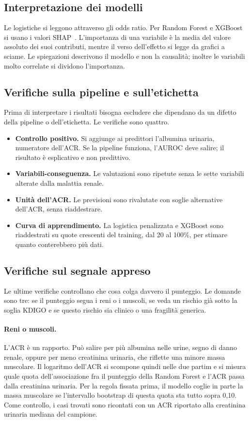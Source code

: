 \documentclass[a4paper, 12pt, oneside]{book}
\begin{document}
\subsection{Interpretazione dei modelli}

Le logistiche si leggono attraverso gli odds ratio. Per Random Forest e XGBoost si usano i valori SHAP~\cite{lundberg_unified_2017}. L'importanza di una variabile è la media del valore assoluto dei suoi contributi, mentre il verso dell'effetto si legge da grafici a sciame. Le spiegazioni descrivono il modello e non la causalità; inoltre le variabili molto correlate si dividono l'importanza.

\subsection{Verifiche sulla pipeline e sull'etichetta}

Prima di interpretare i risultati bisogna escludere che dipendano da un difetto della pipeline o dell'etichetta. Le verifiche sono quattro.
\begin{itemize}
	\item \textbf{Controllo positivo.} Si aggiunge ai predittori l'albumina urinaria, numeratore dell'ACR. Se la pipeline funziona, l'AUROC deve salire; il risultato è esplicativo e non predittivo.
	\item \textbf{Variabili-conseguenza.} Le valutazioni sono ripetute senza le sette variabili alterate dalla malattia renale.
	\item \textbf{Unità dell'ACR.} Le previsioni sono rivalutate con soglie alternative dell'ACR, senza riaddestrare.
	\item \textbf{Curva di apprendimento.} La logistica penalizzata e XGBoost sono riaddestrati su quote crescenti del training, dal 20 al 100\%, per stimare quanto conterebbero più dati.
\end{itemize}

\subsection{Verifiche sul segnale appreso}

Le ultime verifiche controllano che cosa colga davvero il punteggio. Le domande sono tre: se il punteggio segua i reni o i muscoli, se veda un rischio già sotto la soglia KDIGO e se questo rischio sia clinico o una fragilità generica.

\paragraph{Reni o muscoli.} L'ACR è un rapporto. Può salire per più albumina nelle urine, segno di danno renale, oppure per meno creatinina urinaria, che riflette una minore massa muscolare. Il logaritmo dell'ACR si scompone quindi nelle due partim e si misura quale quota dell'associazione fra il punteggio della Random Forest e l'ACR passa dalla creatinina urinaria. Per la regola fissata prima, il modello coglie in parte la massa muscolare se l'intervallo bootstrap di questa quota sta tutto sopra 0,10. Come controllo, i casi trovati sono ricontati con un ACR riportato alla creatinina urinaria mediana del campione.
\end{document}
